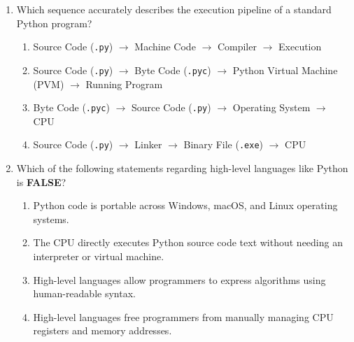 \documentclass[11pt,a4paper]{article}
\begin{document}
\begin{enumerate}[label=\textbf{Q\arabic*.},leftmargin=2em,itemsep=2pt,topsep=1pt]
\begin{enumerate}[label=\Alph*.,noitemsep,topsep=0.5pt,leftmargin=2em]
    \item High-level languages bypass memory and directly command peripheral circuits.

    \item Secondary storage replaces CPU registers during complex computation.

  \end{enumerate}

  \item Which sequence accurately describes the execution pipeline of a standard Python program?

  \begin{enumerate}[label=\Alph*.,noitemsep,topsep=0.5pt,leftmargin=2em]

    \item Source Code (\texttt{.py}) $\rightarrow$ Machine Code $\rightarrow$ Compiler $\rightarrow$ Execution

    \item Source Code (\texttt{.py}) $\rightarrow$ Byte Code (\texttt{.pyc}) $\rightarrow$ Python Virtual Machine (PVM) $\rightarrow$ Running Program

    \item Byte Code (\texttt{.pyc}) $\rightarrow$ Source Code (\texttt{.py}) $\rightarrow$ Operating System $\rightarrow$ CPU

    \item Source Code (\texttt{.py}) $\rightarrow$ Linker $\rightarrow$ Binary File (\texttt{.exe}) $\rightarrow$ CPU

  \end{enumerate}

  \item Which of the following statements regarding high-level languages like Python is \textbf{FALSE}?

  \begin{enumerate}[label=\Alph*.,noitemsep,topsep=0.5pt,leftmargin=2em]

    \item Python code is portable across Windows, macOS, and Linux operating systems.

    \item The CPU directly executes Python source code text without needing an interpreter or virtual machine.

    \item High-level languages allow programmers to express algorithms using human-readable syntax.

    \item High-level languages free programmers from manually managing CPU registers and memory addresses.


\end{enumerate}
\end{enumerate}
\end{document}

